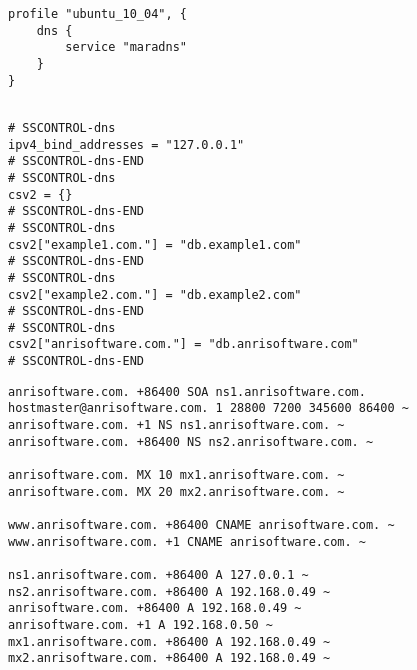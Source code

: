 \begin{lstlisting}[style=Java,label=lst:dns_ubuntu_profile_min,
title={Minimal Ubuntu MaraDNS profile, only the DNS service type is needed. The other profile properties are set to default values.}]
profile "ubuntu_10_04", {
    dns {
        service "maradns"
    }
}
\end{lstlisting}

\begin{lstlisting}[style=rcfile_nonumbers,
label=lst:dns_mararc_example,
title={Example MaraDNS configuration file that is created from the DNS profile 
and script. The file is saved as /etc/maradns/mararc}]

# SSCONTROL-dns
ipv4_bind_addresses = "127.0.0.1"
# SSCONTROL-dns-END
# SSCONTROL-dns
csv2 = {}
# SSCONTROL-dns-END
# SSCONTROL-dns
csv2["example1.com."] = "db.example1.com"
# SSCONTROL-dns-END
# SSCONTROL-dns
csv2["example2.com."] = "db.example2.com"
# SSCONTROL-dns-END
# SSCONTROL-dns
csv2["anrisoftware.com."] = "db.anrisoftware.com"
# SSCONTROL-dns-END
\end{lstlisting}

\begin{lstlisting}[style=rcfile_nonumbers,
label=lst:dns_zone1_example,
title={Example MaraDNS zone configuration file that is created from the 
DNS script. The file is saved as /etc/maradns/db.anrisoftware.com}]
anrisoftware.com. +86400 SOA ns1.anrisoftware.com. hostmaster@anrisoftware.com. 1 28800 7200 345600 86400 ~
anrisoftware.com. +1 NS ns1.anrisoftware.com. ~
anrisoftware.com. +86400 NS ns2.anrisoftware.com. ~

anrisoftware.com. MX 10 mx1.anrisoftware.com. ~
anrisoftware.com. MX 20 mx2.anrisoftware.com. ~

www.anrisoftware.com. +86400 CNAME anrisoftware.com. ~
www.anrisoftware.com. +1 CNAME anrisoftware.com. ~

ns1.anrisoftware.com. +86400 A 127.0.0.1 ~
ns2.anrisoftware.com. +86400 A 192.168.0.49 ~
anrisoftware.com. +86400 A 192.168.0.49 ~
anrisoftware.com. +1 A 192.168.0.50 ~
mx1.anrisoftware.com. +86400 A 192.168.0.49 ~
mx2.anrisoftware.com. +86400 A 192.168.0.49 ~

\end{lstlisting}

